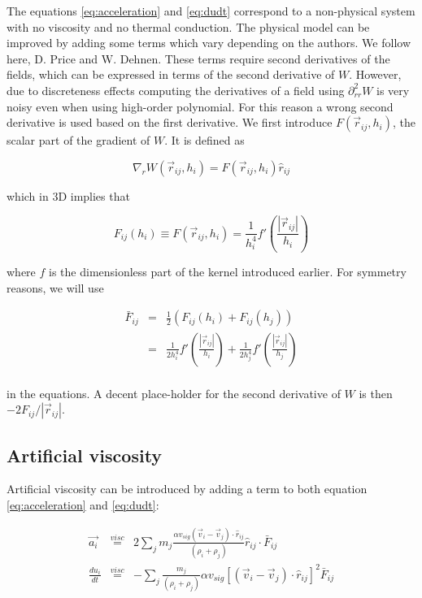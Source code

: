 \documentclass[a4paper,10pt]{article}
\begin{document}
The equations \ref{eq:acceleration} and \ref{eq:dudt} correspond to a non-physical system with no viscosity and no
thermal conduction. The physical model can be improved by adding some terms which vary depending on the authors. We
follow here, D. Price and W. Dehnen.
These terms require second derivatives of the fields, which can be expressed in terms of the second derivative of $W$.
However, due to discreteness effects computing the derivatives of a field using $\partial^2_{rr}W$ is very noisy even
when using high-order polynomial. For this reason a wrong second derivative is used based on the first derivative. We
first introduce $F(\vec{r}_{ij},h_i)$, the scalar part of the gradient of $W$. It is defined as

\begin{equation}
 \nabla_r W(\vec{r}_{ij},h_i) = F(\vec{r}_{ij},h_i) \hat{r}_{ij}
\end{equation}

which in 3D implies that

\begin{equation}
 F_{ij}(h_i) \equiv F(\vec{r}_{ij},h_i) = \frac{1}{h_i^4}f'\left(\frac{|\vec{r}_{ij}|}{h_i}\right)
\end{equation}

where $f$ is the dimensionless part of the kernel introduced earlier. For symmetry reasons, we will use

\begin{eqnarray}
 \bar{F}_{ij} &=& \frac{1}{2} \left(F_{ij}(h_i) + F_{ij}(h_j)\right) \\
	      &=& \frac{1}{2h_i^4}f'\left(\frac{|\vec{r}_{ij}|}{h_i}\right) +
\frac{1}{2h_j^4}f'\left(\frac{|\vec{r}_{ij}|}{h_j}\right) \\
\end{eqnarray}

in the equations. A decent place-holder for the second derivative of $W$ is then $-2F_{ij}/|\vec{r}_{ij}|$.

\subsection{Artificial viscosity}

 Artificial viscosity can be introduced by adding a term to both equation \ref{eq:acceleration} and \ref{eq:dudt}:

\begin{eqnarray}
  \vec{a_i} &\stackrel{visc}{=}& 2\sum_j m_j \frac{\alpha v_{sig}\left(\vec{v}_i -
\vec{v}_j\right)\cdot\hat{r}_{ij}}{\left(\rho_i + \rho_j\right)}\hat{r}_{ij}\cdot \bar{F}_{ij} \label{eq:visc}\\
 \frac{du_i}{dt} &\stackrel{visc}{=}& -\sum_j \frac{m_j}{(\rho_i + \rho_j)} \alpha
v_{sig}\left[\left(\vec{v}_i-\vec{v}_j\right)\cdot\hat{r}_{ij}\right]^2 \bar{F}_{ij}
\end{eqnarray}
\end{document}
